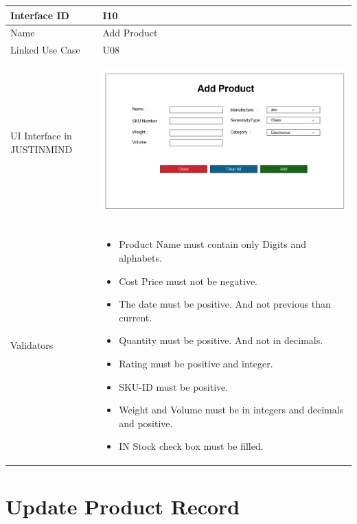 \documentclass[12pt,a4paper]{report}
\begin{document}
\begin{tabular}{ | m{3cm} | m{12cm}| } \hline

Interface ID & I10  \\\hline

Name & Add Product  \\ \hline

Linked Use Case & U08	 \\ \hline


UI Interface in JUSTINMIND & \begin{center} \includegraphics[scale=0.3]{./User Interface/UI-008 Add Product@1x.png}\end{center}  \\ \hline

Validators & 
\begin{itemize}
\item   Product Name must contain only Digits and alphabets.
\item Cost Price must not be negative.
\item The date must be positive. And not previous than current.
\item Quantity must be positive. And not in decimals.
\item Rating must be positive and integer.
\item SKU-ID must be positive.
\item Weight and Volume must be in integers and decimals and positive.
\item IN Stock check box must be filled.


\end{itemize}
\\ \hline

\end{tabular} 
\section{Update Product Record}
\end{document}
